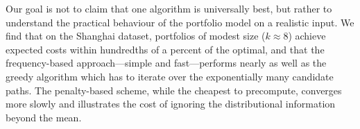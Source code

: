 Our goal is not to claim that one algorithm is universally best, but rather to understand the practical behaviour of the portfolio model on a realistic input. We find that on the Shanghai dataset, portfolios of modest size ($k \approx 8$) achieve expected costs within hundredths of a percent of the optimal, and that the frequency-based approach---simple and fast---performs nearly as well as the greedy algorithm which has to iterate over the exponentially many candidate paths. The penalty-based scheme, while the cheapest to precompute, converges more slowly and illustrates the cost of ignoring the distributional information beyond the mean.
